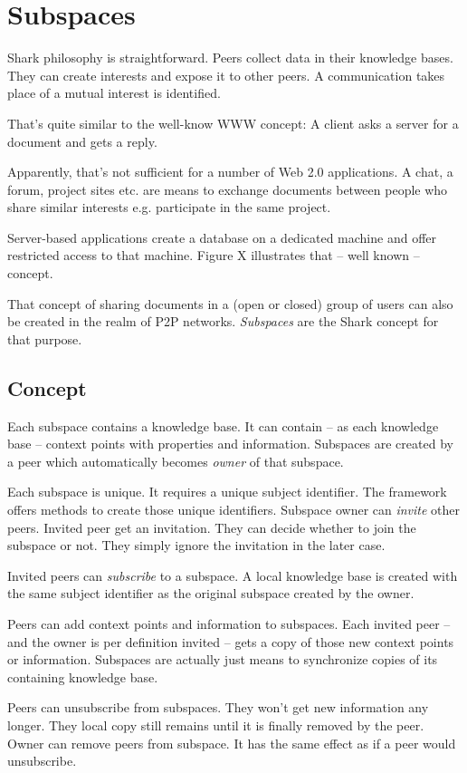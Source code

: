 \chapter{Subspaces}
Shark philosophy is straightforward. Peers collect data in their
knowledge bases. They can create interests and expose it to other 
peers. A communication takes place of a mutual interest is identified.

That's quite similar to the well-know WWW concept: A client asks a 
server for a document and gets a reply.

Apparently, that's not sufficient for a number of Web 2.0 applications.
A chat, a forum, project sites etc. are means to exchange documents 
between people who share similar interests e.g. participate in the same
project.

Server-based applications create a database on a dedicated machine
and offer restricted access to that machine. Figure X illustrates that
-- well known -- concept.

That concept of sharing documents in a (open or closed) group 
of users can also be created in the realm of P2P networks. 
{\it Subspaces} are the Shark concept for that purpose.

\section{Concept}
Each subspace contains a knowledge base. It can contain -- as each knowledge base -- context points with properties and information. Subspaces are created by a peer which automatically becomes {\it owner} of that subspace. 

Each subspace is unique. It requires a unique subject identifier. The framework offers methods to create those unique identifiers. Subspace owner can {\it invite} other peers. Invited peer get an invitation. They can decide whether to join the subspace or not. They simply ignore the invitation in the later case.

Invited peers can {\it subscribe} to a subspace. A local knowledge base is created with the same subject identifier as the original subspace created by
the owner. 

Peers can add context points and information to subspaces. Each invited peer -- and the owner is per definition invited -- gets a copy of those new context points or information. Subspaces are actually just means to synchronize copies of its containing knowledge base.

Peers can unsubscribe from subspaces. They won't get new information any longer. They local copy still remains until it is finally removed by the peer. Owner can remove peers from subspace. It has the same effect as if a peer 
would unsubscribe.

